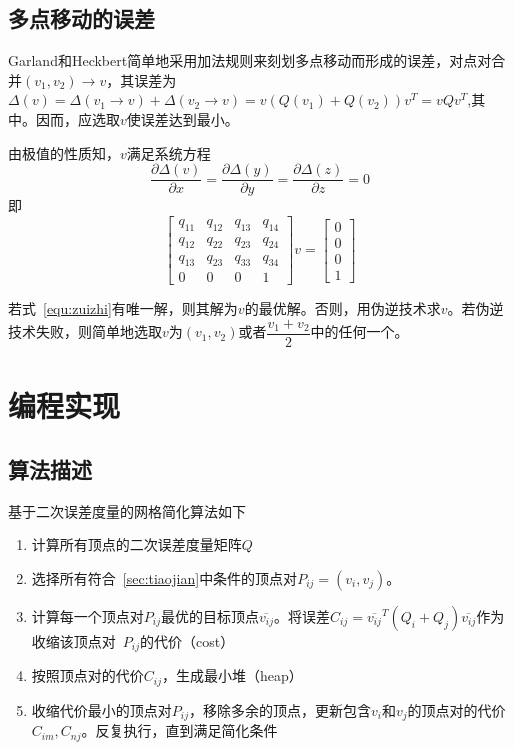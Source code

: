 \documentclass{article}
\begin{document}
\subsection{多点移动的误差} 
Garland和Heckbert简单地采用加法规则来刻划多点移动而形成的误差，对点对合并$(v_1,v_2)\rightarrow v$，其误差为$\Delta(v)=\Delta(v_1\rightarrow v)+\Delta(v_2\rightarrow v)=v(Q(v_1)+Q(v_2))v^T=vQv^T$,其中。因而，应选取$v$使误差达到最小。\par
由极值的性质知，$v$满足系统方程$$\dfrac{\partial \Delta(v)}{\partial x}=\dfrac{\partial \Delta(y)}{\partial y}=\dfrac{\partial \Delta(z)}{\partial z}=0$$
即
\begin{equation}
\label{equ:zuizhi}
\left[ 
\begin{array}{cccc}
q_{11} & q_{12} & q_{13} & q_{14} \\
q_{12} & q_{22} & q_{23} & q_{24} \\
q_{13} & q_{23} & q_{33} & q_{34} \\
0 & 0 & 0 & 1
\end{array}
\right]v=
\left[ 
\begin{array}{c}
0\\0\\0\\1
\end{array}
\right]
\end{equation}\par
若式~\eqref{equ:zuizhi}有唯一解，则其解为$v$的最优解。否则，用伪逆技术求$v$。若伪逆技术失败，则简单地选取$v$为$(v_1,v_2)$或者$\dfrac{v_1+v_2}{2}$中的任何一个。
\section{编程实现}
\subsection{算法描述}
基于二次误差度量的网格简化算法如下
\begin{enumerate}
\item 计算所有顶点的二次误差度量矩阵$Q$
\item 选择所有符合~\ref{sec:tiaojian}中条件的顶点对$P_{ij}=(v_i,v_j)$。
\item 计算每一个顶点对$P_{ij}$最优的目标顶点$\overline{v_{ij}}$。将误差$C_{ij}=\overline{v_{ij}}^T(Q_i+Q_j)\overline{v_{ij}}$作为收缩该顶点对~$P_{ij}$的代价（cost）
\item 按照顶点对的代价$C_{ij}$，生成最小堆（heap）\cite{leiserson2001introduction}
\item 收缩代价最小的顶点对$P_{ij}$，移除多余的顶点，更新包含$v_i$和$v_j$的顶点对的代价$C_{im},C_{nj}$。反复执行，直到满足简化条件
\end{enumerate}
\end{document}
